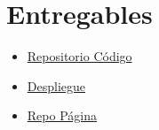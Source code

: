 \section{Entregables}

\begin{itemize}
	\item \href{https://github.com/smonsalve/Epi}{Repositorio Código}
	\item \href{https://dengue.heroku.com}{Despliegue}
	\item \href{https://gitlab.com/smonsalve/dengue}{Repo Página}




\end{itemize}